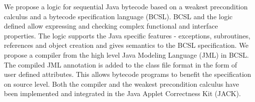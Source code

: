 We propose a logic for sequential Java bytecode based on a weakest precondition calculus and a bytecode specification language (BCSL). BCSL and the logic defined allow expressing and checking complex functional and interface properties. The logic supports the Java specific features - exceptions, subroutines, references and object creation and gives semantics to the BCSL specification. We propose a compiler from the high level Java Modeling Language (JML) in BCSL. The compiled JML annotation is added to the class file format in the form of user defined attributes. This allows bytecode programs to benefit the specification on source level. Both the compiler and the weakest precondition calculus have been implemented and integrated in the Java Applet Correctness Kit (JACK).

